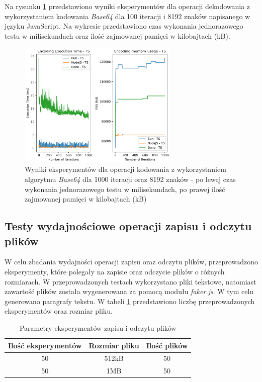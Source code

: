 Na rysunku \ref{fig:decoding_e2_ts} przedstawiono wyniki eksperymentów dla operacji dekodowania z wykorzystaniem kodowania \textit{Base64} dla 100 iteracji i 8192 znaków napisanego w języku JavaScript. Na wykresie przedstawiono czas wykonania jednorazowego testu w milisekundach oraz ilość zajmowanej pamięci w kilobajtach (kB).

\begin{figure}[H]
  \centering
  \includegraphics[width=0.68\textwidth]{Figures/coding/base64_1000_encoding_ts.png}
  \caption{Wyniki eksperymentów dla operacji kodowania z wykorzystaniem algorytmu \textit{Base64} dla 1000 iteracji oraz 8192 znaków - po lewej czas wykonania jednorazowego testu w milisekundach, po prawej ilość zajmowanej pamięci w kilobajtach (kB)}
  \label{fig:decoding_e2_ts}
\end{figure}

\subsection{Testy wydajnościowe operacji zapisu i odczytu plików}
W celu zbadania wydajności operacji zapisu oraz odczytu plików, przeprowadzono eksperymenty, które polegały na zapisie oraz odczycie plików o różnych rozmiarach. W przeprowadzonych testach wykorzystano pliki tekstowe, natomiast zawartość plików została wygenerowana za pomocą modułu \textit{faker.js}. W tym celu generowano paragrafy tekstu. W tabeli \ref{tab:file_experiments} przedstawiono liczbę przeprowadzonych eksperymentów oraz rozmiar pliku.

\begin{table}[H]
  \centering
  \caption{Parametry eksperymentów zapisu i odczytu plików}
  \begin{tabular}{|c|c|c|}
    \hline
    \textbf{Ilość eksperymentów} & \textbf{Rozmiar pliku} & \textbf{Ilość plików} \\ \hline
    50 & 512kB & 50 \\ \hline
    50 & 1MB & 50 \\ \hline
  \end{tabular}
  \label{tab:file_experiments}
\end{table}

